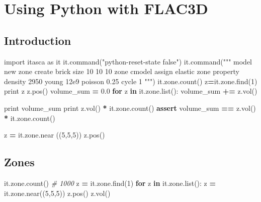 \documentclass[a4paper, nobind]{templates/ociamthesis}
\newenvironment{Shaded}{\begin{snugshade}}{\end{snugshade}}
\newcommand{\BuiltInTok}[1]{#1}
\newcommand{\CommentTok}[1]{\textcolor[rgb]{0.56,0.35,0.01}{\textit{#1}}}
\newcommand{\ControlFlowTok}[1]{\textcolor[rgb]{0.13,0.29,0.53}{\textbf{#1}}}
\newcommand{\DecValTok}[1]{\textcolor[rgb]{0.00,0.00,0.81}{#1}}
\newcommand{\FloatTok}[1]{\textcolor[rgb]{0.00,0.00,0.81}{#1}}
\newcommand{\ImportTok}[1]{#1}
\newcommand{\KeywordTok}[1]{\textcolor[rgb]{0.13,0.29,0.53}{\textbf{#1}}}
\newcommand{\NormalTok}[1]{#1}
\newcommand{\OperatorTok}[1]{\textcolor[rgb]{0.81,0.36,0.00}{\textbf{#1}}}
\newcommand{\StringTok}[1]{\textcolor[rgb]{0.31,0.60,0.02}{#1}}
\renewenvironment{Shaded}
{
  \vspace{10pt}%
  \begin{snugshade}%
}{%
  \end{snugshade}%
  \vspace{8pt}%
}
\begin{document}
\newpage

\hypertarget{using-python-with-flac3d}{%
\chapter{Using Python with FLAC3D}\label{using-python-with-flac3d}}

\hypertarget{introduction}{%
\section{Introduction}\label{introduction}}

\begin{Shaded}
\begin{Highlighting}[]
\ImportTok{import}\NormalTok{ itasca }\ImportTok{as}\NormalTok{ it}
\NormalTok{it.command(}\StringTok{"python{-}reset{-}state false"}\NormalTok{)}
\NormalTok{it.command(}\StringTok{"""}
\StringTok{model new}
\StringTok{zone create brick size 10 10 10}
\StringTok{zone cmodel assign elastic}
\StringTok{zone property density 2950 young 12e9 poisson 0.25}
\StringTok{cycle 1}
\StringTok{"""}\NormalTok{)}
\NormalTok{it.zone.count()}
\NormalTok{z}\OperatorTok{=}\NormalTok{it.zone.find(}\DecValTok{1}\NormalTok{)}
\BuiltInTok{print}\NormalTok{ z}
\NormalTok{z.pos()}
\NormalTok{volume\_sum }\OperatorTok{=} \FloatTok{0.0}
\ControlFlowTok{for}\NormalTok{ z }\KeywordTok{in}\NormalTok{ it.zone.}\BuiltInTok{list}\NormalTok{():}
\NormalTok{  volume\_sum }\OperatorTok{+=}\NormalTok{ z.vol()}

\BuiltInTok{print}\NormalTok{ volume\_sum}
\BuiltInTok{print}\NormalTok{ z.vol() }\OperatorTok{*}\NormalTok{ it.zone.count()}
\ControlFlowTok{assert}\NormalTok{ volume\_sum }\OperatorTok{==}\NormalTok{ z.vol() }\OperatorTok{*}\NormalTok{ it.zone.count()}

\NormalTok{z }\OperatorTok{=}\NormalTok{ it.zone.near ((}\DecValTok{5}\NormalTok{,}\DecValTok{5}\NormalTok{,}\DecValTok{5}\NormalTok{))}
\NormalTok{z.pos()}
\end{Highlighting}
\end{Shaded}

\hypertarget{zones-2}{%
\section{Zones}\label{zones-2}}

\begin{Shaded}
\begin{Highlighting}[]
\NormalTok{it.zone.count() }\CommentTok{\# 1000}
\NormalTok{z }\OperatorTok{=}\NormalTok{ it.zone.find(}\DecValTok{1}\NormalTok{)}
\ControlFlowTok{for}\NormalTok{ z }\KeywordTok{in}\NormalTok{ it.zone.}\BuiltInTok{list}\NormalTok{():}
\NormalTok{  z }\OperatorTok{=}\NormalTok{ it.zone.near((}\DecValTok{5}\NormalTok{,}\DecValTok{5}\NormalTok{,}\DecValTok{5}\NormalTok{))}
\NormalTok{z.pos()}
\NormalTok{z.vol()}
\end{Highlighting}
\end{Shaded}
\end{document}
